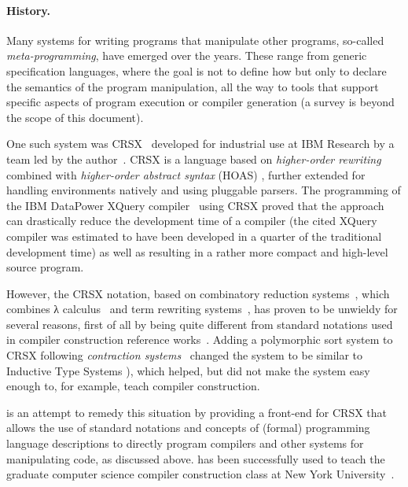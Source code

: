 \documentclass[11pt]{article} %
\begin{document}
\paragraph*{History.}

Many systems for writing programs that manipulate other programs, so-called \emph{meta-programming},
have emerged over the years. These range from generic specification languages, where the goal is not to
define how but only to declare the semantics of the program manipulation, all the way to tools that
support specific aspects of program execution or compiler generation (a survey is beyond the scope
of this document).

One such system was CRSX~\cite{Rose:1996} developed for industrial use at IBM Research by a team led
by the author~\cite{Rose:hor2007,Rose:hor2010,Rose:rta2011,crsx}.  CRSX is a language based on
\emph{higher-order rewriting}~\cite{Jouannaud:klop2005} combined with \emph{higher-order abstract
  syntax} (HOAS) \cite{PfenningElliot:pldi1988}, further extended for handling environments natively
and using pluggable parsers. The programming of the IBM Data\-Power XQuery
compiler~\cite{dp60:ibm2013} using CRSX proved that the approach can drastically reduce the
development time of a compiler (the cited XQuery compiler was estimated to have been developed in a
quarter of the traditional development time) as well as resulting in a rather more compact and
high-level source program.

However, the CRSX notation, based on combinatory reduction systems~\cite{Klop:1980,Klop+:tcs1993},
which combines λ calculus~\cite{Church:1941,Barendregt:1984} and term rewriting
systems~\cite{Klop:1992:Handbook}, has proven to be unwieldy for several reasons, first of all by
being quite different from standard notations used in compiler construction reference
works~\cite{Aho+:2006}. Adding a polymorphic sort system to CRSX following \emph{contraction
  systems}~\cite{Aczel:1978} changed the system to be similar to Inductive Type Systems
\cite{BlanquiJouannaudOkada:tcs2002}), which helped, but did not make the system easy enough to, for
example, teach compiler construction.

\HAX is an attempt to remedy this situation by providing a front-end for CRSX that allows the use of
standard notations and concepts of (formal) programming language descriptions to directly program
compilers and other systems for manipulating code, as discussed above. \HAX has been successfully
used to teach the graduate computer science compiler construction class at New York
University~\cite{RoseRose:cims2015}.
\end{document}
